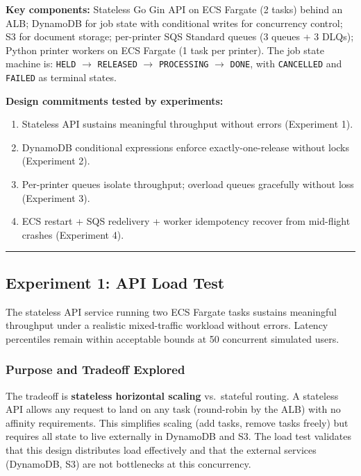\documentclass[11pt,letterpaper]{article}
\begin{document}
\medskip
\textbf{Key components:} Stateless Go Gin API on ECS Fargate (2 tasks) behind an ALB; DynamoDB for job state with conditional writes for concurrency control; S3 for document storage; per-printer SQS Standard queues (3 queues + 3 DLQs); Python printer workers on ECS Fargate (1 task per printer). The job state machine is: \texttt{HELD} $\to$ \texttt{RELEASED} $\to$ \texttt{PROCESSING} $\to$ \texttt{DONE}, with \texttt{CANCELLED} and \texttt{FAILED} as terminal states.

\medskip
\textbf{Design commitments tested by experiments:}
\begin{enumerate}[noitemsep]
  \item Stateless API sustains meaningful throughput without errors (Experiment 1).
  \item DynamoDB conditional expressions enforce exactly-one-release without locks (Experiment 2).
  \item Per-printer queues isolate throughput; overload queues gracefully without loss (Experiment 3).
  \item ECS restart + SQS redelivery + worker idempotency recover from mid-flight crashes (Experiment 4).
\end{enumerate}

\medskip\hrule\medskip

\subsection{Experiment 1: API Load Test}
\label{sec:exp1}

\begin{claimbox}
The stateless API service running two ECS Fargate tasks sustains meaningful throughput under a realistic mixed-traffic workload without errors. Latency percentiles remain within acceptable bounds at 50 concurrent simulated users.
\end{claimbox}

\subsubsection{Purpose and Tradeoff Explored}
The tradeoff is \textbf{stateless horizontal scaling} vs.\ stateful routing. A stateless API allows any request to land on any task (round-robin by the ALB) with no affinity requirements. This simplifies scaling (add tasks, remove tasks freely) but requires all state to live externally in DynamoDB and S3. The load test validates that this design distributes load effectively and that the external services (DynamoDB, S3) are not bottlenecks at this concurrency.
\end{document}
